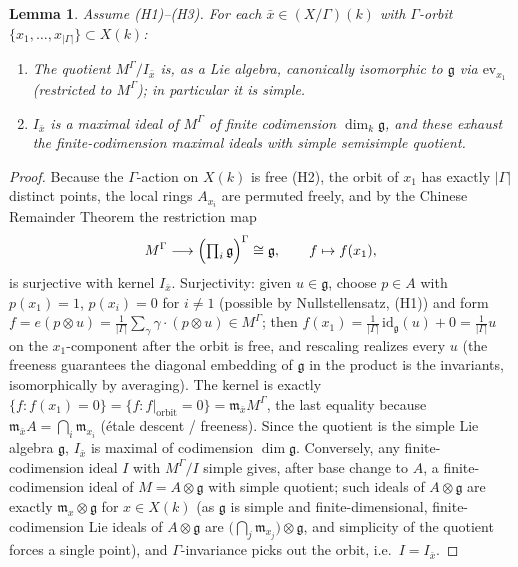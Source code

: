 \documentclass{amsart}
\newtheorem{lemma}{Lemma}
\theoremstyle{definition}
\newcommand{\g}{\mathfrak{g}}
\newcommand{\M}{M}
\begin{document}
\begin{lemma}\label{lem:fibres}
Assume \textnormal{(H1)--(H3)}.  For each $\bar x\in (X/\Gamma)(k)$ with
$\Gamma$-orbit $\{x_1,\dots,x_{|\Gamma|}\}\subset X(k)$:
\begin{enumerate}
\item The quotient $\M^\Gamma/I_{\bar x}$ is, as a Lie algebra,
canonically isomorphic to $\g$ via $\mathrm{ev}_{x_1}$ (restricted to
$\M^\Gamma$); in particular it is simple.
\item $I_{\bar x}$ is a maximal ideal of $\M^\Gamma$ of finite
codimension $\dim_k\g$, and these exhaust the finite-codimension maximal
ideals with simple semisimple quotient.
\end{enumerate}
\end{lemma}
\begin{proof}
Because the $\Gamma$-action on $X(k)$ is free (H2), the orbit of $x_1$ has
exactly $|\Gamma|$ distinct points, the local rings $A_{x_i}$ are permuted
freely, and by the Chinese Remainder Theorem the restriction map
\[
\M^\Gamma\longrightarrow\Bigl(\textstyle\prod_{i}\g\Bigr)^\Gamma\cong\g,
\qquad f\mapsto f(x_1),
\]
is surjective with kernel $I_{\bar x}$.  Surjectivity: given $u\in\g$,
choose $p\in A$ with $p(x_1)=1$, $p(x_i)=0$ for $i\ne1$ (possible by
Nullstellensatz, (H1)) and form $f=e(p\otimes u)=\frac1{|\Gamma|}
\sum_\gamma \gamma\cdot(p\otimes u)\in\M^\Gamma$; then
$f(x_1)=\frac1{|\Gamma|}\,\mathrm{id}_\g(u)+0=\frac1{|\Gamma|}u$ on the
$x_1$-component after the orbit is free, and rescaling realizes every $u$
(the freeness guarantees the diagonal embedding of $\g$ in the product is
the invariants, isomorphically by averaging).  The kernel is exactly
$\{f:f(x_1)=0\}=\{f:f|_{\text{orbit}}=0\}=\mathfrak m_{\bar x}\M^\Gamma$,
the last equality because $\mathfrak m_{\bar x}A=\bigcap_i\mathfrak m_{x_i}$
(\'etale descent / freeness).  Since the quotient is the simple Lie
algebra $\g$, $I_{\bar x}$ is maximal of codimension $\dim\g$.  Conversely,
any finite-codimension ideal $I$ with $\M^\Gamma/I$ simple gives, after
base change to $A$, a finite-codimension ideal of $\M=A\otimes\g$ with
simple quotient; such ideals of $A\otimes\g$ are exactly $\mathfrak
m_x\otimes\g$ for $x\in X(k)$ (as $\g$ is simple and finite-dimensional,
finite-codimension Lie ideals of $A\otimes\g$ are $\bigl(\bigcap_j\mathfrak
m_{x_j}\bigr)\otimes\g$, and simplicity of the quotient forces a single
point), and $\Gamma$-invariance picks out the orbit, i.e.\
$I=I_{\bar x}$.
\end{proof}
\end{document}
